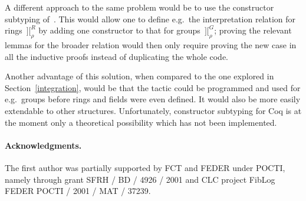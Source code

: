 \documentclass[runningheads]{llncs}
\newcommand{\intII}{\,]\![}
\newcommand{\intrelG}{\mathbin{\intII_\rho^G}}
\newcommand{\intrelR}{\mathbin{\intII_\rho^R}}
\begin{document}
\medskip
\noindent
A different approach to the same problem would be to use the constructor
subtyping of~\cite{bar:raa:00}.
This would allow one to define e.g.\ the interpretation relation for
rings $\intrelR$ by adding one constructor to that for groups $\intrelG$;
proving the relevant lemmas for the broader relation would then only
require proving the new case in all the inductive proofs instead of
duplicating the whole code.

Another advantage of this solution, when compared to the one explored
in Section~\ref{integration}, would be that the tactic could be programmed
and used for e.g.\ groups before rings and fields were even defined.
It would also be more easily extendable to other structures.
Unfortunately, constructor subtyping for Coq is at the moment only a
theoretical possibility which has not been implemented.

\medskip
\paragraph{Acknowledgments.}
The first author was partially supported by FCT and FEDER under POCTI,
namely through grant SFRH / BD / 4926 / 2001
and CLC project FibLog FEDER POCTI / 2001 / MAT / 37239.



\end{document}
